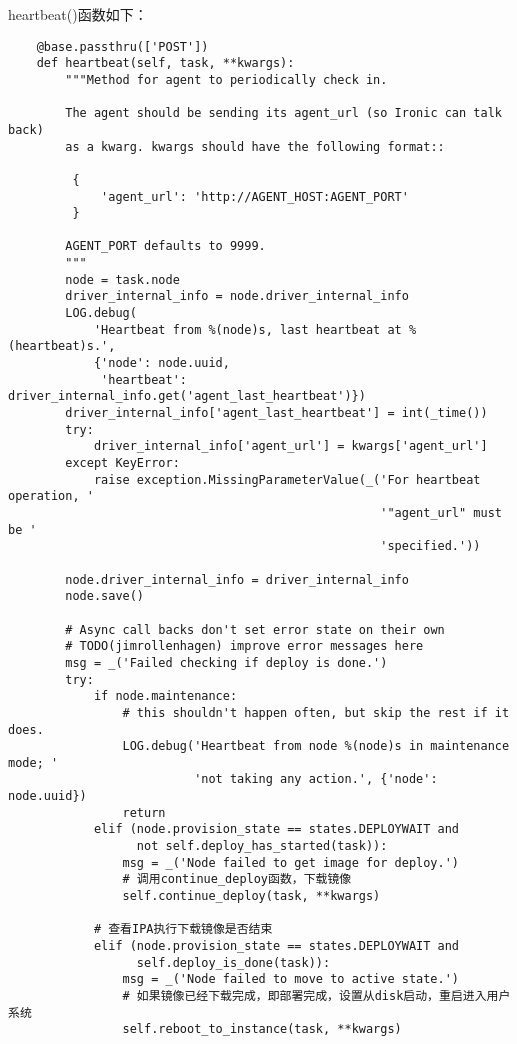 \documentclass[a4paper,left=2.5cm,right=2.5cm,11pt]{article}
\begin{document}
	heartbeat()函数如下：
	\begin{lstlisting}
	@base.passthru(['POST'])
    def heartbeat(self, task, **kwargs):
        """Method for agent to periodically check in.

        The agent should be sending its agent_url (so Ironic can talk back)
        as a kwarg. kwargs should have the following format::

         {
             'agent_url': 'http://AGENT_HOST:AGENT_PORT'
         }

        AGENT_PORT defaults to 9999.
        """
        node = task.node
        driver_internal_info = node.driver_internal_info
        LOG.debug(
            'Heartbeat from %(node)s, last heartbeat at %(heartbeat)s.',
            {'node': node.uuid,
             'heartbeat': driver_internal_info.get('agent_last_heartbeat')})
        driver_internal_info['agent_last_heartbeat'] = int(_time())
        try:
            driver_internal_info['agent_url'] = kwargs['agent_url']
        except KeyError:
            raise exception.MissingParameterValue(_('For heartbeat operation, '
                                                    '"agent_url" must be '
                                                    'specified.'))

        node.driver_internal_info = driver_internal_info
        node.save()

        # Async call backs don't set error state on their own
        # TODO(jimrollenhagen) improve error messages here
        msg = _('Failed checking if deploy is done.')
        try:
            if node.maintenance:
                # this shouldn't happen often, but skip the rest if it does.
                LOG.debug('Heartbeat from node %(node)s in maintenance mode; '
                          'not taking any action.', {'node': node.uuid})
                return
            elif (node.provision_state == states.DEPLOYWAIT and
                  not self.deploy_has_started(task)):
                msg = _('Node failed to get image for deploy.')
				# 调用continue_deploy函数，下载镜像
                self.continue_deploy(task, **kwargs)         

			# 查看IPA执行下载镜像是否结束
            elif (node.provision_state == states.DEPLOYWAIT and
                  self.deploy_is_done(task)):             
                msg = _('Node failed to move to active state.')
				# 如果镜像已经下载完成，即部署完成，设置从disk启动，重启进入用户系统
                self.reboot_to_instance(task, **kwargs)


\end{lstlisting}
\end{document}
